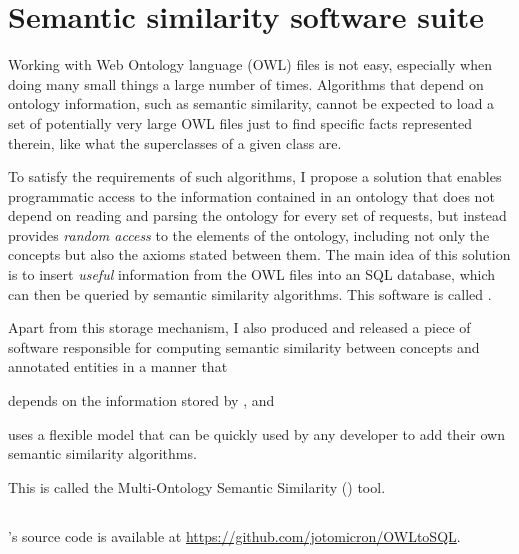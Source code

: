 \chapter{Semantic similarity software suite} \label{chap:technical}

Working with Web Ontology language (OWL) files is not easy, especially when doing many small things a large number of times. Algorithms that depend on ontology information, such as semantic similarity, cannot be expected to load a set of potentially very large OWL files just to find specific facts represented therein, like what the superclasses of a given class are.

To satisfy the requirements of such algorithms, I propose a solution that enables programmatic access to the information contained in an ontology that does not depend on reading and parsing the ontology for every set of requests, but instead provides \emph{random access} to the elements of the ontology, including not only the concepts but also the axioms stated between them. The main idea of this solution is to insert \emph{useful} information from the OWL files into an SQL database, which can then be queried by semantic similarity algorithms. This software is called \owlsql.

Apart from this storage mechanism, I also produced and released a piece of software responsible for computing semantic similarity between concepts and annotated entities in a manner that
\begin{paralist}
    \item depends on the information stored by \owlsql, and
    \item uses a flexible model that can be quickly used by any developer to add their own semantic similarity algorithms.
\end{paralist}
This is called the Multi-Ontology Semantic Similarity (\mossy) tool.


\section{\owlsql} \label{sec:technical/owlsql}

\begin{note-paper}
    \owlsql's source code is available at \url{https://github.com/jotomicron/OWLtoSQL}.
\end{note-paper}

